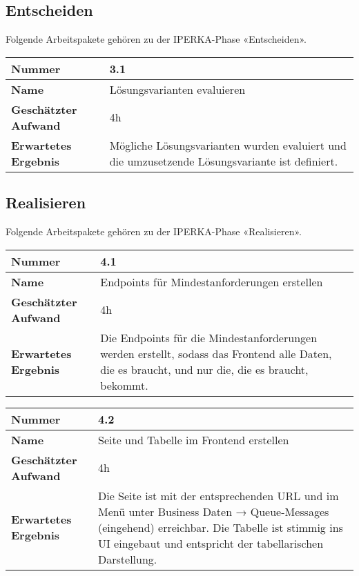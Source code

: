 \subsection{Entscheiden}
Folgende Arbeitspakete gehören zu der IPERKA-Phase «Entscheiden».

\begin{longtable}{p{}|p{}}
	\hline
	\textbf{Nummer}                 & \textbf{3.1}            \\
	\hline
	\textbf{Name}   				& Lösungsvarianten evaluieren                  \\
	\hline
	\textbf{Geschätzter Aufwand}    & 4h                                    \\
	\hline
	\textbf{Erwartetes Ergebnis}    & Mögliche Lösungsvarianten wurden evaluiert und die umzusetzende Lösungsvariante ist definiert.                                    \\
	\hline
\end{longtable}\label{tab:entscheiden-3.1}

\subsection{Realisieren}
Folgende Arbeitspakete gehören zu der IPERKA-Phase «Realisieren».

\begin{longtable}{p{}|p{}}
	\hline
	\textbf{Nummer}                 & \textbf{4.1}            \\
	\hline
	\textbf{Name}   				& Endpoints für Mindestanforderungen erstellen                  \\
	\hline
	\textbf{Geschätzter Aufwand}    & 4h                                    \\
	\hline
	\textbf{Erwartetes Ergebnis}    & Die Endpoints für die Mindestanforderungen werden erstellt, sodass das Frontend alle Daten, die es braucht, und nur die, die es braucht, bekommt.                                    \\
	\hline
\end{longtable}\label{tab:realisieren-4.1}

\begin{longtable}{p{}|p{}}
	\hline
	\textbf{Nummer}                 & \textbf{4.2}            \\
	\hline
	\textbf{Name}   				& Seite und Tabelle im Frontend erstellen                  \\
	\hline
	\textbf{Geschätzter Aufwand}    & 4h                                    \\
	\hline
	\textbf{Erwartetes Ergebnis}    & Die Seite ist mit der entsprechenden URL und im Menü unter Business Daten → Queue-Messages (eingehend) erreichbar. Die Tabelle ist stimmig ins UI eingebaut und entspricht der tabellarischen Darstellung.                                    \\
	\hline
\end{longtable}\label{tab:realisieren-4.2}

